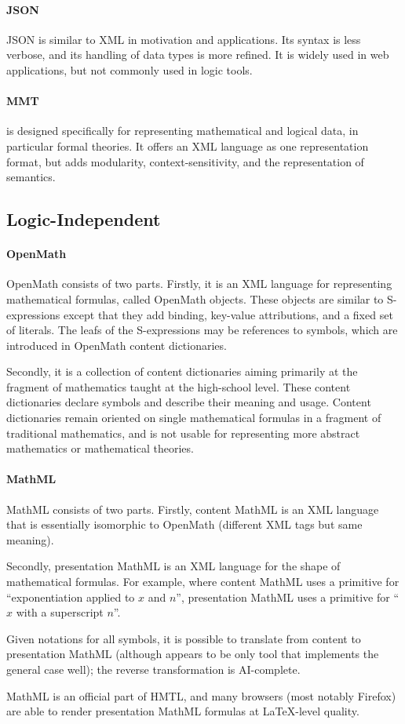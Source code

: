 \documentclass[12pt]{article}
\newcommand{\system}[2][]{\paragraph{#2}#2 \ifnonempty[\cite{#2}]{#1}{\cite{#1}}}
\begin{document}
\system{JSON}
is similar to XML in motivation and applications.
Its syntax is less verbose, and its handling of data types is more refined.
It is widely used in web applications, but not commonly used in logic tools.

\paragraph{MMT}
\mmt is designed specifically for representing mathematical and logical data, in particular formal theories.
It offers an XML language as one representation format, but adds modularity, context-sensitivity, and the representation of semantics.

\subsection{Logic-Independent}

\system{OpenMath} consists of two parts.
Firstly, it is an XML language for representing mathematical formulas, called OpenMath objects.
These objects are similar to S-expressions except that they add binding, key-value attributions, and a fixed set of literals.
The leafs of the S-expressions may be references to symbols, which are introduced in OpenMath content dictionaries.

Secondly, it is a collection of content dictionaries aiming primarily at the fragment of mathematics taught at the high-school level.
These content dictionaries declare symbols and describe their meaning and usage.
Content dictionaries remain oriented on single mathematical formulas in a fragment of traditional mathematics, and is not usable for representing more abstract mathematics or mathematical theories.

\system{MathML} consists of two parts.
Firstly, content MathML is an XML language that is essentially isomorphic to OpenMath (different XML tags but same meaning).

Secondly, presentation MathML is an XML language for the shape of mathematical formulas.
For example, where content MathML uses a primitive for ``exponentiation applied to $x$ and $n$'', presentation MathML uses a primitive for ``$x$ with a superscript $n$''.

Given notations for all symbols, it is possible to translate from content to presentation MathML (although \mmt appears to be only tool that implements the general case well); the reverse transformation is AI-complete.

MathML is an official part of HMTL, and many browsers (most notably Firefox) are able to render presentation MathML formulas at LaTeX-level quality.
\end{document}
